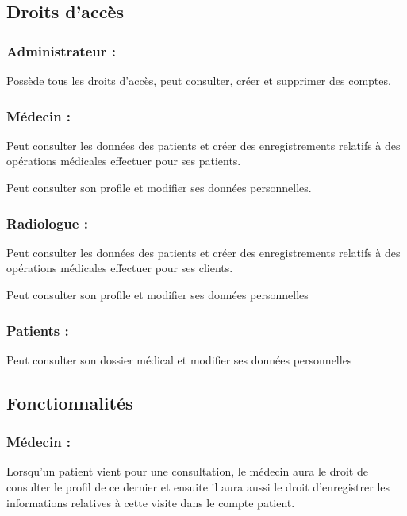\subsection{Droits d’accès}

\subsubsection{Administrateur :}
   

Possède tous les droits d’accès, peut consulter, créer et supprimer des comptes. 

\subsubsection{ Médecin :}

Peut consulter les données des patients et créer des enregistrements relatifs à des opérations médicales effectuer pour ses patients. 

Peut consulter son profile et modifier ses données personnelles.

\subsubsection{Radiologue :}   

Peut consulter les données des patients et créer des enregistrements relatifs à des opérations médicales effectuer pour ses clients. 

Peut consulter son profile et modifier ses données personnelles 

\subsubsection{Patients :}

Peut consulter son dossier médical et modifier ses données personnelles 

\subsection{Fonctionnalités}

\subsubsection{Médecin :} 

Lorsqu’un patient vient pour une consultation, le médecin aura le droit de consulter le profil de ce dernier et ensuite il aura aussi le droit d’enregistrer les informations relatives à cette visite dans le compte patient. 

